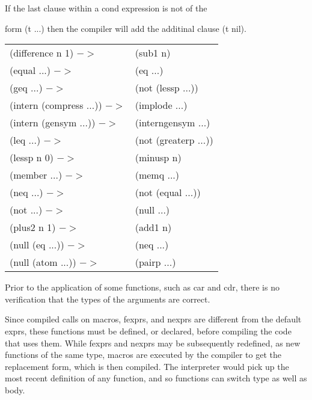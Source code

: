     If  the  last clause within a cond expression is not of the

     form (t ...) then  the  compiler  will  add  the  additinal
     clause (t nil).\\

\begin{tabular}{lp{6.0cm}}
    (difference n 1)  $->$ &  (sub1 n)\\

    (equal ...)  $->$ &  (eq ...)\\

    (geq ...)  $->$ & (not (lessp ...))\\

    (intern (compress ...))  $->$ &  (implode ...)\\

    (intern (gensym ...))  $->$ &  (interngensym ...)\\

    (leq ...)  $->$ &  (not (greaterp ...))\\

    (lessp n 0)  $->$ &  (minusp n)\\

    (member ...)  $->$ &  (memq ...)\\

    (neq ...)  $->$ &  (not (equal ...))\\

    (not ...)  $->$ &  (null ...)\\

    (plus2 n 1)  $->$ &  (add1 n)\\

    (null (eq ...))  $->$ &  (neq ...)\\

    (null (atom ...))  $->$ &  (pairp ...)\\
\end{tabular}

\vspace{0.5cm}
  Prior  to  the  application of some functions, such as car and
cdr, there is no verification that the types  of  the  arguments
are correct.

  Since  compiled  calls  on  macros,  fexprs,  and  nexprs  are
different from  the  default  exprs,  these  functions  must  be
defined,  or declared, before compiling the code that uses them.
While fexprs and nexprs may be subsequently  redefined,  as  new
functions  of the same type, macros are executed by the compiler
to get  the  replacement  form,  which  is  then  compiled.  The
interpreter  would  pick  up  the  most recent definition of any
function, and so functions can switch type as well as body.

